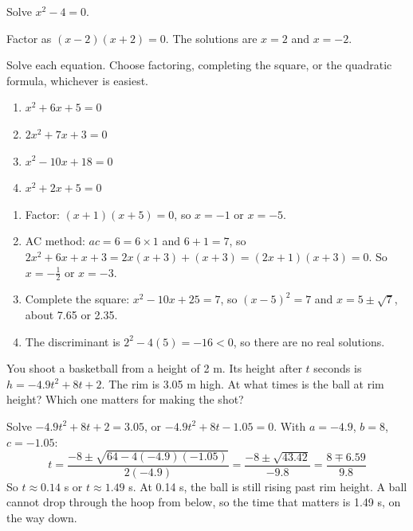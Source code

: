 \begin{Exercise}[title={Difference of Squares}, label=quad1]
Solve $x^2 - 4 = 0$.
\end{Exercise}
\begin{Answer}[ref=quad1]
Factor as $(x - 2)(x + 2) = 0$. The solutions are $x = 2$ and $x = -2$.
\end{Answer}

\begin{Exercise}[title={Pick your method}, label=quad2]
Solve each equation. Choose factoring, completing the square, or the
quadratic formula, whichever is easiest.
\begin{enumerate}
\item $x^2 + 6x + 5 = 0$
\item $2x^2 + 7x + 3 = 0$
\item $x^2 - 10x + 18 = 0$
\item $x^2 + 2x + 5 = 0$
\end{enumerate}
\end{Exercise}
\begin{Answer}[ref=quad2]
\begin{enumerate}
\item Factor: $(x + 1)(x + 5) = 0$, so $x = -1$ or $x = -5$.
\item AC method: $ac = 6 = 6 \times 1$ and $6 + 1 = 7$, so
      $2x^2 + 6x + x + 3 = 2x(x + 3) + (x + 3) = (2x + 1)(x + 3) = 0$.
      So $x = -\frac{1}{2}$ or $x = -3$.
\item Complete the square: $x^2 - 10x + 25 = 7$, so $(x - 5)^2 = 7$ and
      $x = 5 \pm \sqrt{7}$, about 7.65 or 2.35.
\item The discriminant is $2^2 - 4(5) = -16 < 0$, so there are no real
      solutions.
\end{enumerate}
\end{Answer}

\begin{Exercise}[title={Nothing but net}, label=quad3]
You shoot a basketball from a height of 2 m. Its height after $t$ seconds
is $h = -4.9t^2 + 8t + 2$. The rim is 3.05 m high. At what times is the
ball at rim height? Which one matters for making the shot?
\end{Exercise}
\begin{Answer}[ref=quad3]
Solve $-4.9t^2 + 8t + 2 = 3.05$, or $-4.9t^2 + 8t - 1.05 = 0$. With
$a = -4.9$, $b = 8$, $c = -1.05$:
$$t = \frac{-8 \pm \sqrt{64 - 4(-4.9)(-1.05)}}{2(-4.9)} = \frac{-8 \pm \sqrt{43.42}}{-9.8} = \frac{8 \mp 6.59}{9.8}$$
So $t \approx 0.14$ s or $t \approx 1.49$ s. At 0.14 s, the ball is still
rising past rim height. A ball cannot drop through the hoop from below, so
the time that matters is 1.49 s, on the way down.
\end{Answer}
